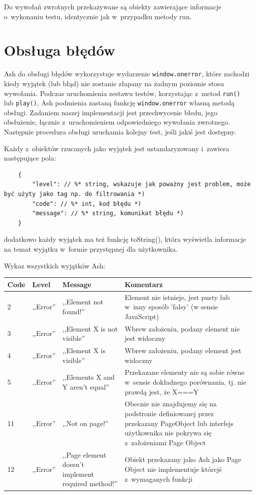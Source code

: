 \documentclass[brudnopis]{xmgr}
\begin{document}
Do wywołań zwrotnych przekazywane są obiekty zawierające informacje o~wykonaniu testu, identycznie jak w~przypadku metody run.

\section{Obsługa błędów}

Ash do obsługi błędów wykorzystuje wydarzenie \texttt{window.onerror}, które zachodzi kiedy wyjątek (lub błąd) nie zostanie złapany na żadnym poziomie stosu wywołania. Podczas uruchomienia zestawu testów, korzystając z~metod \texttt{run()} lub \texttt{play()}, Ash podmienia zastaną funkcję \texttt{window.onerror} własną metodą obsługi. Zadaniem naszej implementacji jest przechwycenie błedu, jego obsłużenie, łącznie z~uruchomieniem odpowiedniego wywołania zwrotnego. Następnie procedura obsługi uruchamia kolejny test, jeśli jakiś jest dostępny. 

Każdy z~obiektów rzucanych jako wyjątek jest ustandaryzowany i~zawiera następujące pola: 

\begin{lstlisting}
	{
		"level": // %* string, wskazuje jak poważny jest problem, może być użyty jako tag np. do filtrowania *) 
		"code": // %* int, kod błędu *)
		"message": // %* string, komunikat błędu *) 
	}
\end{lstlisting}

dodatkowo każdy wyjątek ma też funkcję toString(), która wyświetla informacje na temat wyjątku w~formie przystępnej dla użytkownika.

Wykaz wszystkich wyjątków Ash:

\begin{center}
    \begin{tabularx}{\textwidth}{ | p{1cm} | p{2cm} | X | X |}
    \hline
    Code & Level & Message & Komentarz \\ \hline
    2 & ,,Error'' & ,,Element not found!'' & Element nie istnieje, jest pusty lub w~inny sposób 'falsy' (w sensie JavaScript)  \\ \hline
    3 & ,,Error'' & ,,Element X is not visible'' & Wbrew założeniu, podany element nie jest widoczny  \\ \hline
    4 & ,,Error'' & ,,Element X is visible'' & Wbrew założeniu, podany element jest widoczny  \\ \hline
    5 & ,,Error'' & ,,Elements X and Y aren't equal'' & Przekazane elementy nie są sobie równe w~sensie dokładnego porównania, tj.  nie prawdą jest, że X===Y  \\ \hline
    11 & ,,Error'' & ,,Not on page!'' & Obecnie nie znajdujemy się na podstronie definiowanej przez przekazany PageObject lub interfejs użytkownika nie pokrywa się z~założeniami Page Object  \\ \hline
    12 & ,,Error'' & ,,Page element doesn't implement required method!'' & Obiekt przekazany jako Ash jako Page Object nie implementuje którejś z~wymaganych funkcji  \\ \hline
    \end{tabularx}
\end{center}
\end{document}
